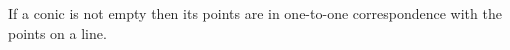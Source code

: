 If a conic is not empty then its points are in one-to-one correspondence with the points on a line.
